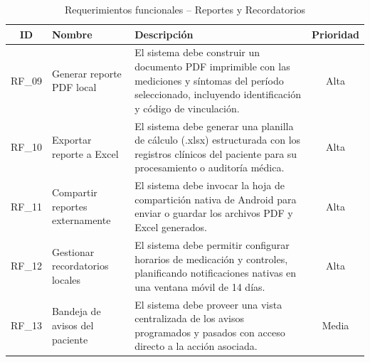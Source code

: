 \begin{table}[H]
\centering
\renewcommand{\arraystretch}{1.3}
\setlength{\tabcolsep}{6pt}
\begin{tabularx}{\textwidth}{|c|p{3.5cm}|X|c|}
\hline
\textbf{ID} & \textbf{Nombre} & \textbf{Descripción} & \textbf{Prioridad} \\ \hline
RF\_09 & Generar reporte PDF local & El sistema debe construir un documento PDF imprimible con las mediciones y síntomas del período seleccionado, incluyendo identificación y código de vinculación. & Alta \\ \hline
RF\_10 & Exportar reporte a Excel & El sistema debe generar una planilla de cálculo (.xlsx) estructurada con los registros clínicos del paciente para su procesamiento o auditoría médica. & Alta \\ \hline
RF\_11 & Compartir reportes externamente & El sistema debe invocar la hoja de compartición nativa de Android para enviar o guardar los archivos PDF y Excel generados. & Alta \\ \hline
RF\_12 & Gestionar recordatorios locales & El sistema debe permitir configurar horarios de medicación y controles, planificando notificaciones nativas en una ventana móvil de 14 días. & Alta \\ \hline
RF\_13 & Bandeja de avisos del paciente & El sistema debe proveer una vista centralizada de los avisos programados y pasados con acceso directo a la acción asociada. & Media \\ \hline
\end{tabularx}
\caption{Requerimientos funcionales – Reportes y Recordatorios}
\label{tab:rf_reportes_recordatorios}
\end{table}


